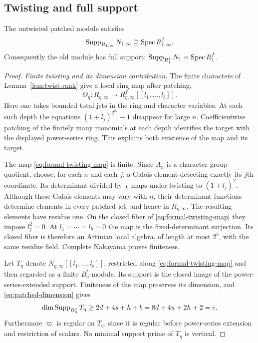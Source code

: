 \subsection{Twisting and full support}

\begin{proposition}
\label{prop:patched-support}
The untwisted patched module satisfies
\[
 \operatorname{Supp}_{R_{1,\infty}}N_{1,\infty}
       \supseteq\operatorname{Spec} R_{1,\infty}^f.
\]
Consequently the old module has full support:
$\operatorname{Supp}_{R_1^f}N_1=\operatorname{Spec} R_1^f$.
\end{proposition}

\begin{proof}
\emph{Finite twisting and its dimension contribution.}
The finite characters of Lemma~\ref{lem:twist-rank} give a local
ring map after patching,
\begin{equation}\label{eq:formal-twisting-map}
 \Theta_\eta:R_{\eta,\infty}\longrightarrow
          R_{\eta,\infty}^f[[l_1,\ldots,l_b]].
\end{equation}
Here one takes bounded total jets in the ring and character
variables.  At each such depth the equations
$(1+l_j)^{2^{a_n}}-1$ disappear for large $n$.
Coefficientwise patching of the finitely many monomials at
each depth identifies the target with the displayed power-series
ring.  This explains both existence of the map and its target.

The map \eqref{eq:formal-twisting-map} is finite.  Since $A_n$
is a character-group quotient, choose, for each $n$ and each $j$,
a Galois element detecting exactly its $j$th coordinate.  Its
determinant divided by $\chi$ maps under twisting to
$(1+l_j)^2$.  Although these Galois elements may vary with $n$,
their determinant functions determine elements in every patched
jet, and hence in $R_{\eta,\infty}$.  The resulting elements
have residue one.  On the closed fiber of
\eqref{eq:formal-twisting-map} they impose $l_j^2=0$.
At $l_1=\cdots=l_b=0$ the map is the fixed-determinant
surjection.  Its closed fiber is therefore an Artinian local
algebra, of length at most $2^b$, with the same residue field.
Complete Nakayama proves finiteness.

Let $T_\eta$ denote
$N_{\eta,\infty}[[l_1,\ldots,l_b]]$, restricted along
\eqref{eq:formal-twisting-map} and then regarded as a finite
$B_\eta^*$-module.  Its support is the closed image of the
power-series-extended support.  Finiteness of the map preserves
its dimension, and \eqref{eq:patched-dimension} gives
\[
 \dim\operatorname{Supp}_{B_\eta^*}T_\eta
 \geq 2d+4s+h+b
 =8d+4u+2h+2=e.
\]
Furthermore $\varpi$ is regular on $T_\eta$, since it is
regular before power-series extension and restriction of scalars.
No minimal support prime of $T_\eta$ is vertical.


\end{proof}
